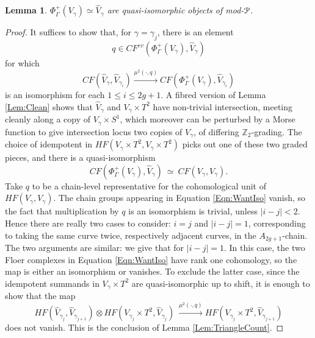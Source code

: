 \documentclass[reqno,10pt]{amsart}
\numberwithin{equation}{section}
\newcommand{\bZ}{{\mathbb Z}}
\newcommand{\scrP}{\EuScript{P}}
\newtheorem{Lemma}[thm]{Lemma}
\theoremstyle{remark}
\begin{document}
 
\begin{Lemma} \label{Lem:Step2}
$\Phi^+_{\Gamma}(V_{\gamma}) \simeq \hat{V}_{\gamma}$ are quasi-isomorphic objects of mod-$\scrP$.
\end{Lemma}

\begin{proof}
It suffices to show that, for $\gamma=\gamma_j$,  there is an element 
\[
q \in CF^{ev}(\Phi_{\Gamma}^+(V_{\gamma}), \hat{V}_{\gamma})
\]
for which
\begin{equation} \label{Eqn:WantIso}
CF(\hat{V}_{\gamma}, \hat{V}_{\gamma_i}) \xrightarrow{\mu^2(\cdot,q)} CF(\Phi_{\Gamma}^+(V_{\gamma}), \hat{V}_{\gamma_i})
\end{equation}
is an isomorphism for each $1\leq i \leq 2g+1$.  A fibred version of Lemma \ref{Lem:Clean} shows that $\hat{V}_{\gamma}$ and $V_{\gamma} \times T^2$ have non-trivial intersection, meeting cleanly along a copy of $V_{\gamma} \times S^1$, which moreover can be perturbed by a Morse function to give intersection locus two copies of $V_{\gamma}$, of differing $\bZ_2$-grading.  The choice of idempotent in $HF(V_{\gamma} \times T^2, V_{\gamma} \times T^2)$ picks out one of these two graded pieces, and there is  a quasi-isomorphism
\[
 CF(\Phi_{\Gamma}^+(V_{\gamma}), \hat{V}_{\gamma}) \ \simeq \ CF(V_{\gamma}, V_{\gamma}).
\]
Take $q$ to be  a chain-level representative for the cohomological unit of $HF(V_{\gamma}, V_{\gamma})$.  The chain groups appearing in Equation \ref{Eqn:WantIso} vanish, so the fact that multiplication by $q$ is an isomorphism is trivial, unless $|i-j| < 2$. Hence there are really two cases to consider: $i=j$ and $|i-j| = 1$, corresponding to taking the same curve twice, respectively adjacent curves, in the $A_{2g+1}$-chain. The two arguments are similar: we give that for $|i-j| = 1$.  In this case, the two Floer complexes in Equation \ref{Eqn:WantIso} have rank one cohomology, so the map is either an isomorphism or vanishes.   To exclude the latter case, since the idempotent summands in $V_{\gamma}\times T^2$ are quasi-isomorphic up to shift, it is enough to show that the map
\begin{equation} 
HF(\hat{V}_{\gamma_{j}}, \hat{V}_{\gamma_{j+1}}) \otimes HF(V_{\gamma_j} \times T^2, \hat{V}_{\gamma_{j}}) \ \xrightarrow{\mu^2(\cdot,q)} HF(V_{\gamma_j} \times T^2, \hat{V}_{\gamma_{j+1}})
\end{equation}
does not vanish. This is the conclusion of Lemma \ref{Lem:TriangleCount}.
\end{proof}
\end{document}
